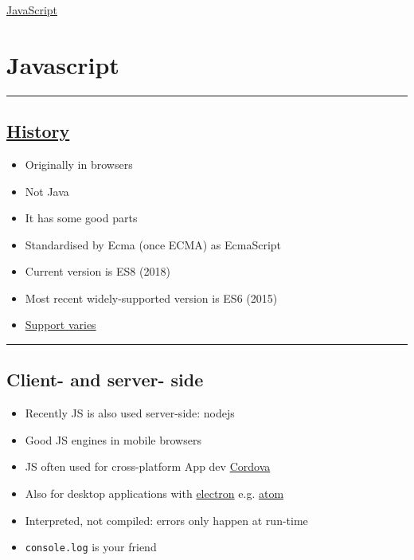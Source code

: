\documentclass{article}[18pt]
\providecommand{\tightlist}{%
  \setlength{\itemsep}{0pt}\setlength{\parskip}{0pt}}
\begin{document}
\begin{center}
\underline{\huge JavaScript}
\end{center}

\hypertarget{javascript}{%
\section{Javascript}\label{javascript}}

\begin{center}\rule{0.5\linewidth}{\linethickness}\end{center}

\hypertarget{history}{%
\subsection{\texorpdfstring{\href{https://app.pluralsight.com/player?name=javascript-good-parts-m2\&mode=live\&clip=0\&course=javascript-good-parts\&author=douglas-crockford}{History}}{History}}\label{history}}

\begin{itemize}
\tightlist
\item
  Originally in browsers
\item
  Not Java
\item
  It has some good parts
\item
  Standardised by Ecma (once ECMA) as EcmaScript
\item
  Current version is ES8 (2018)
\item
  Most recent widely-supported version is ES6 (2015)
\item
  \href{http://kangax.github.io/compat-table/es6/}{Support varies}
\end{itemize}

\begin{center}\rule{0.5\linewidth}{\linethickness}\end{center}

\hypertarget{client--and-server--side}{%
\subsection{Client- and server- side}\label{client--and-server--side}}

\begin{itemize}
\tightlist
\item
  Recently JS is also used server-side: nodejs
\item
  Good JS engines in mobile browsers
\item
  JS often used for cross-platform App dev
  \href{https://cordova.apache.org/}{Cordova}
\item
  Also for desktop applications with
  \href{https://electronjs.org/}{electron} e.g.
  \href{https://atom.io/}{atom}
\item
  Interpreted, not compiled: errors only happen at run-time
\item
  \texttt{console.log} is your friend
\end{itemize}
\end{document}
